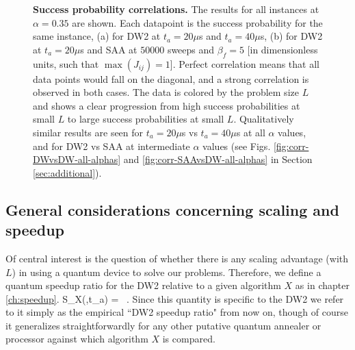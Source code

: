 \begin{figure}[t]
\caption{\textbf{Success probability correlations.} The results for all instances at $\alpha=0.35$ are shown. Each datapoint is the success probability for the same instance, (a) for DW2 at $t_a=20\mu$s and $t_a=40\mu$s, (b) for DW2 at $t_a=20\mu$s and SAA at $50000$ sweeps and $\beta_f=5$ [in dimensionless units, such that $\max(J_{ij}) = 1$]. Perfect correlation means that all data points would fall on the diagonal, and a strong correlation is observed in both cases. The data is colored by the problem size $L$ and shows a clear progression from high success probabilities at small $L$ to large success probabilities at small $L$. Qualitatively similar results are seen for $t_a=20\mu$s vs $t_a=40\mu$s at all $\alpha$ values, and for DW2 vs SAA at intermediate $\alpha$ values (see Figs. \ref{fig:corr-DWvsDW-all-alphas} and \ref{fig:corr-SAAvsDW-all-alphas} in Section \ref{sec:additional}).}
\label{fig:DW-DW-SAA-corr}
\end{figure}

\subsection{General considerations concerning scaling and speedup}

Of central interest is the question of whether there is any scaling advantage (with $L$) in using a quantum device to solve our problems. Therefore, we define a quantum speedup ratio for the DW2 relative to a given algorithm $X$ as in chapter \ref{ch:speedup}.
%
\beq
\label{eq:speedup}
S_X(\lambda,t_a) =  \ .
\eeq
%
Since this quantity is specific to the DW2 we refer to it simply as the empirical ``DW2 speedup ratio" from now on, though of course it generalizes straightforwardly for any other putative quantum annealer or processor against which algorithm $X$ is compared.

